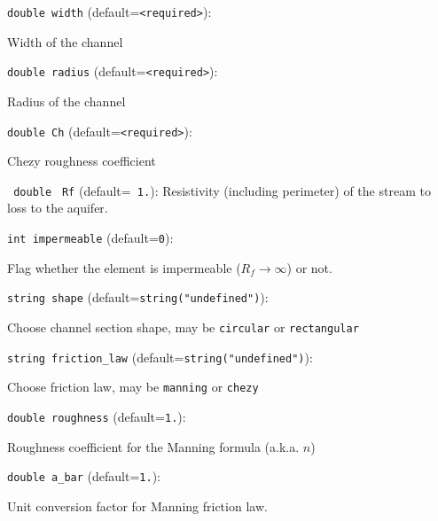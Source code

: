 \item\verb+double width+ {\rm(default=\verb|<required>|)}:

Width of the channel

\item\verb+double radius+ {\rm(default=\verb|<required>|)}:

Radius of the channel

\item\verb+double Ch+ {\rm(default=\verb|<required>|)}:

Chezy roughness coefficient

\item\verb+ double+ \verb+ Rf+ {\rm(default=\verb| 1.|)}:
 Resistivity (including perimeter) of the stream to 
         loss to the aquifer. 
\item\verb+int impermeable+ {\rm(default=\verb|0|)}:

Flag whether the element is impermeable ($R_f\to\infty$) or not. 

\item\verb+string shape+ {\rm(default=\verb|string("undefined")|)}:

Choose channel section shape, may be {\tt circular}
or {\tt rectangular}

\item\verb+string friction_law+ {\rm(default=\verb|string("undefined")|)}:

Choose friction law, may be {\tt manning} or {\tt chezy}

\item\verb+double roughness+ {\rm(default=\verb|1.|)}:

Roughness coefficient for the Manning formula (a.k.a. $n$)

\item\verb+double a_bar+ {\rm(default=\verb|1.|)}:

Unit conversion factor for Manning friction law.

